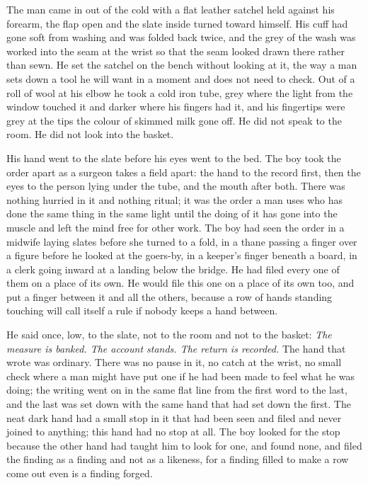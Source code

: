 The man came in out of the cold with a flat leather satchel held against his forearm, the flap open and the slate inside turned toward himself. His cuff had gone soft from washing and was folded back twice, and the grey of the wash was worked into the seam at the wrist so that the seam looked drawn there rather than sewn. He set the satchel on the bench without looking at it, the way a man sets down a tool he will want in a moment and does not need to check. Out of a roll of wool at his elbow he took a cold iron tube, grey where the light from the window touched it and darker where his fingers had it, and his fingertips were grey at the tips the colour of skimmed milk gone off. He did not speak to the room. He did not look into the basket.

His hand went to the slate before his eyes went to the bed. The boy took the order apart as a surgeon takes a field apart: the hand to the record first, then the eyes to the person lying under the tube, and the mouth after both. There was nothing hurried in it and nothing ritual; it was the order a man uses who has done the same thing in the same light until the doing of it has gone into the muscle and left the mind free for other work. The boy had seen the order in a midwife laying slates before she turned to a fold, in a thane passing a finger over a figure before he looked at the goers-by, in a keeper's finger beneath a board, in a clerk going inward at a landing below the bridge. He had filed every one of them on a place of its own. He would file this one on a place of its own too, and put a finger between it and all the others, because a row of hands standing touching will call itself a rule if nobody keeps a hand between.

He said once, low, to the slate, not to the room and not to the basket: \emph{The measure is banked. The account stands. The return is recorded.} The hand that wrote was ordinary. There was no pause in it, no catch at the wrist, no small check where a man might have put one if he had been made to feel what he was doing; the writing went on in the same flat line from the first word to the last, and the last was set down with the same hand that had set down the first. The neat dark hand had a small stop in it that had been seen and filed and never joined to anything; this hand had no stop at all. The boy looked for the stop because the other hand had taught him to look for one, and found none, and filed the finding as a finding and not as a likeness, for a finding filled to make a row come out even is a finding forged.

